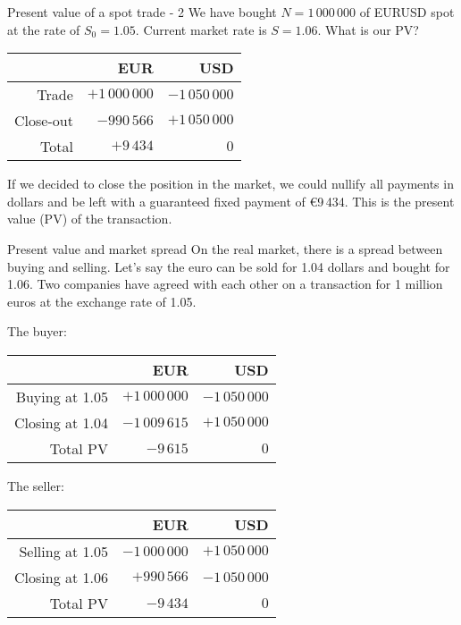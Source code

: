 \documentclass{beamer}
\renewcommand{\EUR}[1]{\textup{\euro}#1}
\begin{document}
\begin{frame}{Present value of a spot trade - 2}
\justify
We have bought $N=1\,000\,000$ of EURUSD spot at the rate of $S_0 = 1.05$. Current market rate is $S=1.06$. What is our PV?

\justify
\centering
\begin{tabular}{r|r|r}
         & EUR               & USD \\ \hline
Trade   & $+1\,000\,000$ & $-1\,050\,000$ \\
Close-out &    $-990\,566$ & $+1\,050\,000$ \\ \hline
Total    &      $+9\,434$ & $0$
\end{tabular}

\justify
If we decided to close the position in the market, we could nullify all payments in dollars and be left with a guaranteed fixed payment of \EUR{9\,434}. This is the present value (PV) of the transaction.
\end{frame}



\begin{frame}{Present value and market spread}
\justify
On the real market, there is a spread between buying and selling. Let's say the euro can be sold for 1.04 dollars and bought for 1.06. Two companies have agreed with each other on a transaction for 1 million euros at the exchange rate of 1.05.

\justify
The buyer:

\centering
\begin{tabular}{r|r|r}
                & EUR                   & USD \\ \hline
Buying at 1.05 & $+1\,000\,000$ & $-1\,050\,000$ \\
Closing at 1.04 & $-1\,009\,615$ & $+1\,050\,000$ \\ \hline
Total PV      &      $-9\,615$ & $0$
\end{tabular}

\justify
The seller:

\centering
\begin{tabular}{r|r|r}
                & EUR                   & USD \\ \hline
Selling at 1.05 & $-1\,000\,000$ & $+1\,050\,000$ \\
Closing at 1.06 & $+990\,566$ & $-1\,050\,000$ \\ \hline
Total PV      &      $-9\,434$ & $0$
\end{tabular} 
\end{frame}
\end{document}
